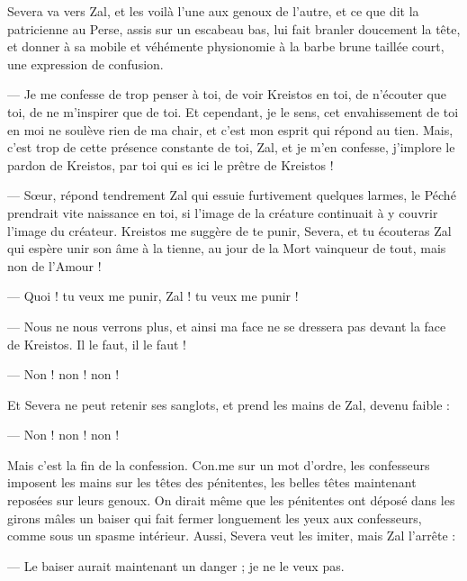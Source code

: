 \documentclass[a4paper, 11pt, oneside, polutonikogreek, french]{article}
\begin{document}
Severa va vers Zal, et les voilà l'une aux genoux de l'autre, et ce que dit la patricienne au Perse, assis sur un escabeau bas, lui fait branler doucement la tête, et donner à sa mobile et véhémente physionomie à la barbe brune taillée court, une expression de confusion.

--- Je me confesse de trop penser à toi, de voir Kreistos en toi, de n'écouter que toi, de ne m'inspirer que de toi. Et cependant, je le sens, cet envahissement de toi en moi ne soulève rien de ma chair, et c'est mon esprit qui répond au tien. Mais, c'est trop de cette présence constante de toi, Zal, et je m'en confesse, j'implore le pardon de Kreistos, par toi qui es ici le prêtre de Kreistos !

--- Sœur, répond tendrement Zal qui essuie furtivement quelques larmes, le Péché prendrait vite naissance en toi, si l'image de la créature continuait à y couvrir l'image du créateur. Kreistos me suggère de te punir, Severa, et tu écouteras Zal qui espère unir son âme à la tienne, au jour de la Mort vainqueur de tout, mais non de l'Amour !

--- Quoi ! tu veux me punir, Zal ! tu veux me punir !

--- Nous ne nous verrons plus, et ainsi ma face ne se dressera pas devant la face de Kreistos. Il le faut, il le faut !

--- Non ! non ! non !

Et Severa ne peut retenir ses sanglots, et prend les mains de Zal, devenu faible :

--- Non ! non ! non !

Mais c'est la fin de la confession. Con.me sur un mot d'ordre, les confesseurs imposent les mains sur les têtes des pénitentes, les belles têtes maintenant reposées sur leurs genoux. On dirait même que les pénitentes ont déposé dans les girons mâles un baiser qui fait fermer longuement les yeux aux confesseurs, comme sous un spasme intérieur. Aussi, Severa veut les imiter, mais Zal l'arrête :

--- Le baiser aurait maintenant un danger ; je ne le veux pas.
\end{document}
